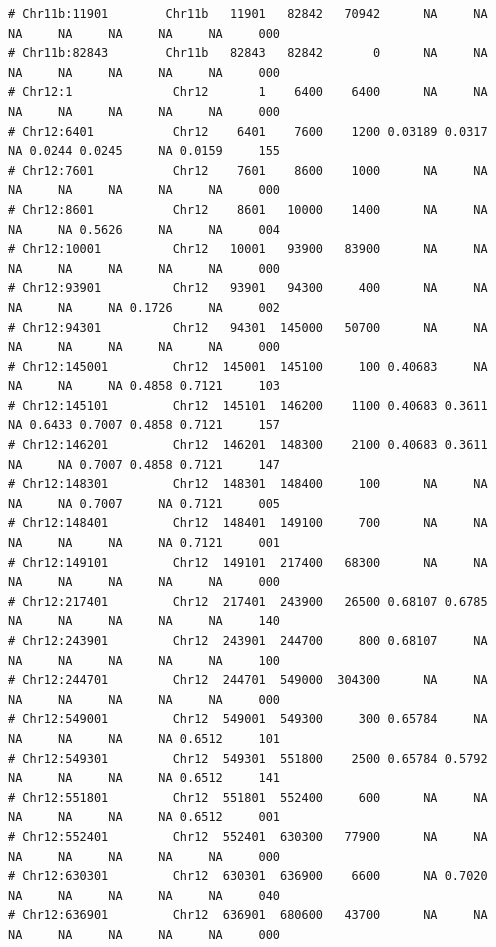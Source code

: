 \documentclass{article}\usepackage[]{graphicx}\usepackage[]{color}
\makeatletter
\newenvironment{kframe}{%
 \def\at@end@of@kframe{}%
 \ifinner\ifhmode%
  \def\at@end@of@kframe{\end{minipage}}%
  \begin{minipage}{\columnwidth}%
 \fi\fi%
 \def\FrameCommand##1{\hskip\@totalleftmargin \hskip-\fboxsep
 \colorbox{shadecolor}{##1}\hskip-\fboxsep
     \hskip-\linewidth \hskip-\@totalleftmargin \hskip\columnwidth}%
 \MakeFramed {\advance\hsize-\width
   \@totalleftmargin\z@ \linewidth\hsize
   \@setminipage}}%
 {\par\unskip\endMakeFramed%
 \at@end@of@kframe}
\newenvironment{knitrout}{}{} %
\makeatother
\begin{document}
\begin{knitrout}
\begin{kframe}
\begin{verbatim}
# Chr11b:11901        Chr11b   11901   82842   70942      NA     NA     NA     NA     NA     NA     NA     000
# Chr11b:82843        Chr11b   82843   82842       0      NA     NA     NA     NA     NA     NA     NA     000
# Chr12:1              Chr12       1    6400    6400      NA     NA     NA     NA     NA     NA     NA     000
# Chr12:6401           Chr12    6401    7600    1200 0.03189 0.0317     NA 0.0244 0.0245     NA 0.0159     155
# Chr12:7601           Chr12    7601    8600    1000      NA     NA     NA     NA     NA     NA     NA     000
# Chr12:8601           Chr12    8601   10000    1400      NA     NA     NA     NA 0.5626     NA     NA     004
# Chr12:10001          Chr12   10001   93900   83900      NA     NA     NA     NA     NA     NA     NA     000
# Chr12:93901          Chr12   93901   94300     400      NA     NA     NA     NA     NA 0.1726     NA     002
# Chr12:94301          Chr12   94301  145000   50700      NA     NA     NA     NA     NA     NA     NA     000
# Chr12:145001         Chr12  145001  145100     100 0.40683     NA     NA     NA     NA 0.4858 0.7121     103
# Chr12:145101         Chr12  145101  146200    1100 0.40683 0.3611     NA 0.6433 0.7007 0.4858 0.7121     157
# Chr12:146201         Chr12  146201  148300    2100 0.40683 0.3611     NA     NA 0.7007 0.4858 0.7121     147
# Chr12:148301         Chr12  148301  148400     100      NA     NA     NA     NA 0.7007     NA 0.7121     005
# Chr12:148401         Chr12  148401  149100     700      NA     NA     NA     NA     NA     NA 0.7121     001
# Chr12:149101         Chr12  149101  217400   68300      NA     NA     NA     NA     NA     NA     NA     000
# Chr12:217401         Chr12  217401  243900   26500 0.68107 0.6785     NA     NA     NA     NA     NA     140
# Chr12:243901         Chr12  243901  244700     800 0.68107     NA     NA     NA     NA     NA     NA     100
# Chr12:244701         Chr12  244701  549000  304300      NA     NA     NA     NA     NA     NA     NA     000
# Chr12:549001         Chr12  549001  549300     300 0.65784     NA     NA     NA     NA     NA 0.6512     101
# Chr12:549301         Chr12  549301  551800    2500 0.65784 0.5792     NA     NA     NA     NA 0.6512     141
# Chr12:551801         Chr12  551801  552400     600      NA     NA     NA     NA     NA     NA 0.6512     001
# Chr12:552401         Chr12  552401  630300   77900      NA     NA     NA     NA     NA     NA     NA     000
# Chr12:630301         Chr12  630301  636900    6600      NA 0.7020     NA     NA     NA     NA     NA     040
# Chr12:636901         Chr12  636901  680600   43700      NA     NA     NA     NA     NA     NA     NA     000

\end{verbatim}
\end{kframe}
\end{knitrout}
\end{document}
